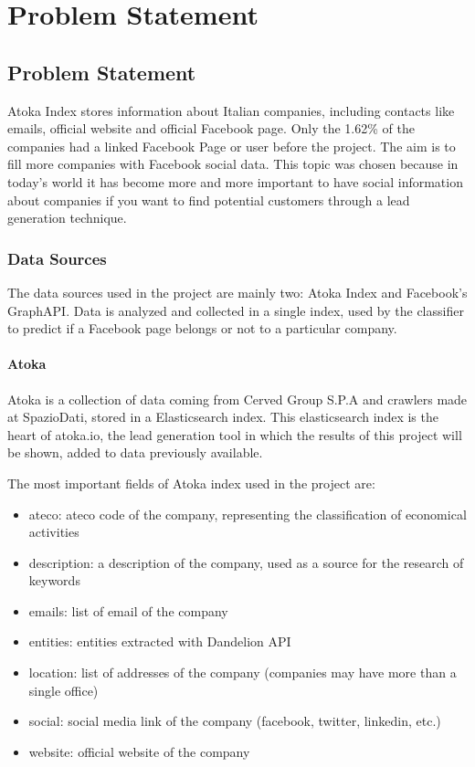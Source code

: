 \chapter{Problem Statement}

\section{Problem Statement}
Atoka Index stores information about Italian companies, including contacts like emails, official website and official Facebook page. Only the 1.62\% of the companies had a linked Facebook Page or user before the project. The aim is to fill more companies with Facebook social data. This topic was chosen because in today's world it has become more and more important to have social information about companies if you want to find potential customers through a lead generation technique.

\subsection{Data Sources}
The data sources used in the project are mainly two: Atoka Index and Facebook's GraphAPI. Data is analyzed and collected in a single index, used by the classifier to predict if a Facebook page belongs or not to a particular company.

\subsubsection{Atoka}
Atoka is a collection of data coming from Cerved Group S.P.A and crawlers made at SpazioDati, stored in a Elasticsearch index. This elasticsearch index is the heart of atoka.io, the lead generation tool in which the results of this project will be shown, added to data previously available.

The most important fields of Atoka index used in the project are:
\begin{itemize}
    \item ateco: ateco code of the company, representing the classification of economical activities
    \item description: a description of the company, used as a source for the research of keywords
    \item emails: list of email of the company
    \item entities: entities extracted with Dandelion API%
    \item location: list of addresses of the company (companies may have more than a single office)
    \item social: social media link of the company (facebook, twitter, linkedin, etc.)
    \item website: official website of the company
\end{itemize}

